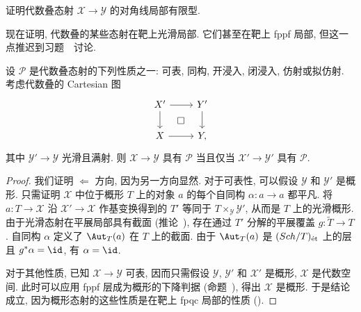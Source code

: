 \begin{exercise}[简单]\label{src:4.3.5}
证明代数叠态射 $\mathcal X\to\mathcal Y$ 的对角线局部有限型.
\end{exercise}
现在证明, 代数叠的某些态射在靶上光滑局部. 它们甚至在靶上 fppf 局部, 但这一点推迟到习题~~讨论.
\begin{proposition}\label{src:4.3.6}
设 $\mathcal P$ 是代数叠态射的下列性质之一: 可表, 同构, 开浸入, 闭浸入, 仿射或拟仿射. 考虑代数叠的 Cartesian 图
\[
\begin{tikzcd}
\mathcal X'\arrow[r]\arrow[d]\arrow[dr,phantom,"\square"]&\mathcal Y'\arrow[d]\\
\mathcal X\arrow[r]&\mathcal Y,
\end{tikzcd}
\]
其中 $\mathcal Y'\to\mathcal Y$ 光滑且满射. 则 $\mathcal X\to\mathcal Y$ 具有 $\mathcal P$ 当且仅当 $\mathcal X'\to\mathcal Y'$ 具有 $\mathcal P$.
\end{proposition}
\begin{proof}
我们证明 $\Leftarrow$ 方向, 因为另一方向显然. 对于可表性, 可以假设 $\mathcal Y$ 和 $\mathcal Y'$ 是概形. 只需证明 $\mathcal X$ 中位于概形 $T$ 上的对象 $a$ 的每个自同构 $\alpha:a\to a$ 都平凡. 将 $a:T\to\mathcal X$ 沿 $\mathcal X'\to\mathcal X$ 作基变换得到的 $T'$ 等同于 $T\times_{\mathcal Y}\mathcal Y'$, 从而是 $T$ 上的光滑概形. 由于光滑态射在平展局部具有截面 (推论~), 存在通过 $T'$ 分解的平展覆盖 $g:\widetilde T\to T$. 自同构 $\alpha$ 定义了 $\Aut_T(a)$ 在 $T$ 上的截面. 由于 $\Aut_T(a)$ 是 $(Sch/T)_{\text{ét}}$ 上的层且 $g^*\alpha=\id$, 有 $\alpha=\id$.

对于其他性质, 已知 $\mathcal X\to\mathcal Y$ 可表, 因而只需假设 $\mathcal Y$, $\mathcal Y'$ 和 $\mathcal X'$ 是概形, $\mathcal X$ 是代数空间. 此时可以应用 fppf 层成为概形的下降判据 (命题~), 得出 $\mathcal X$ 是概形. 于是结论成立, 因为概形态射的这些性质是在靶上 fpqc 局部的性质 ().
\end{proof}

